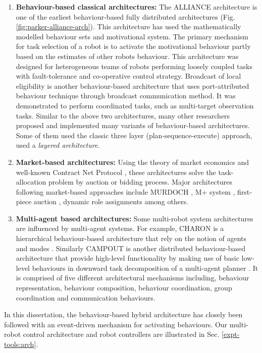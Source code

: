 \begin{enumerate}
\item \textbf{Behaviour-based classical architectures: }
The ALLIANCE architecture \cite{Parker1998} is one of the earliest behaviour-based fully distributed architectures (Fig. \ref{fig:parker-alliance-arch}). This architecture has used the mathematically modelled behaviour sets and motivational system. The primary mechanism for task selection of a robot is to activate the motivational behaviour partly based on the estimates of other robots behaviour. This architecture was designed for heterogeneous teams of robots performing loosely coupled tasks with fault-tolerance and co-operative control strategy. Broadcast of local eligibility  \cite{Werger2001} is another behaviour-based architecture that uses port-attributed behaviour technique through broadcast communication method. It was demonstrated to perform coordinated tasks, such as multi-target observation tasks. Similar to the above two architectures, many other researchers proposed and implemented many variants of behaviour-based architectures. Some of them used the classic three layer (plan-sequence-execute) approach, \cite{Simmons+2002} used a {\em layered architecture}.
%
\item \textbf{Market-based architectures: }
Using the theory of market economics and well-known Contract Net Protocol \cite{Davis1988+}, these architectures solve the task-allocation problem by auction or bidding process. Major architectures following market-based approaches include MURDOCH \cite{Gerkey+2002}, M+ system \cite{Botelho+1999}, first-piece auction \cite{Zlot+2002}, dynamic role assignments \cite{Chaimowicz2002} among others.
%
\item \textbf{Multi-agent based architectures: }
Some multi-robot system architectures are influenced by multi-agent systems. For example, CHARON is a hierarchical behaviour-based architecture that rely on the notion of agents and modes \cite{Chaimowicz2002}. Similarly CAMPOUT is another distributed behaviour-based architecture that provide high-level functionality by making use of basic low-level behaviours in downward task decomposition of a multi-agent planner \cite{Huntsberger+2003}. It is comprised of five different architectural mechanisms including, behaviour representation, behaviour composition, behaviour coordination, group coordination and communication behaviours.
\end{enumerate}
In this dissertation, the behaviour-based hybrid architecture has closely been followed with an event-driven mechanism for activating behaviours. Our multi-robot control architecture and robot controllers are illustrated in Sec. \ref{expt-tools:arch}.
